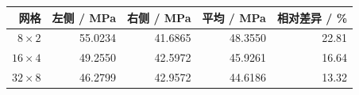 \begin{tabular}{rrrrr}\toprule 网格 & 左侧 / MPa & 右侧 / MPa & 平均 / MPa & 相对差异 / \%\\\midrule
$8\times2$ & 55.0234 & 41.6865 & 48.3550 & 22.81\\
$16\times4$ & 49.2550 & 42.5972 & 45.9261 & 16.64\\
$32\times8$ & 46.2799 & 42.9572 & 44.6186 & 13.32\\
\bottomrule\end{tabular}

